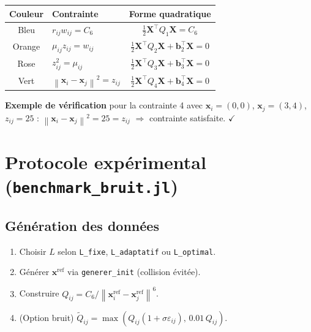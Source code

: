 \documentclass[12pt,a4paper]{article}
\newcommand{\norm}[1]{\left\|#1\right\|}
\begin{document}
\begin{center}
\small
\begin{tabular}{clc}
  \toprule
  \textbf{Couleur} & \textbf{Contrainte} & \textbf{Forme quadratique} \\
  \midrule
  \textcolor{contrainteBleu}{Bleu}   & $r_{ij}w_{ij}=C_6$        & $\frac{1}{2}\mathbf{X}^\top Q_1\mathbf{X}=C_6$ \\
  \textcolor{contrainteOrange}{Orange} & $\mu_{ij}z_{ij}=w_{ij}$   & $\frac{1}{2}\mathbf{X}^\top Q_2\mathbf{X}+\mathbf{b}_2^\top\mathbf{X}=0$ \\
  \textcolor{contrainteRose}{Rose}    & $z_{ij}^2=\mu_{ij}$       & $\frac{1}{2}\mathbf{X}^\top Q_3\mathbf{X}+\mathbf{b}_3^\top\mathbf{X}=0$ \\
  \textcolor{contrainteVert}{Vert}     & $\norm{\mathbf{x}_i-\mathbf{x}_j}^2=z_{ij}$ & $\frac{1}{2}\mathbf{X}^\top Q_4\mathbf{X}+\mathbf{b}_4^\top\mathbf{X}=0$ \\
  \bottomrule
\end{tabular}
\end{center}

\textbf{Exemple de vérification} pour la contrainte 4 avec
$\mathbf{x}_i=(0,0)$, $\mathbf{x}_j=(3,4)$, $z_{ij}=25$ :
$\norm{\mathbf{x}_i-\mathbf{x}_j}^2=25=z_{ij}$ $\Rightarrow$ contrainte satisfaite. $\checkmark$

\section{Protocole expérimental (\texttt{benchmark\_bruit.jl})}

\subsection{Génération des données}

\begin{enumerate}[leftmargin=2em]
  \item Choisir $L$ selon \texttt{L\_fixe}, \texttt{L\_adaptatif} ou \texttt{L\_optimal}.
  \item Générer $\mathbf{x}^{\mathrm{ref}}$ via \texttt{generer\_init} (collision évitée).
  \item Construire $Q_{ij} = C_6/\norm{\mathbf{x}^{\mathrm{ref}}_i-\mathbf{x}^{\mathrm{ref}}_j}^6$.
  \item (Option bruit) $\tilde{Q}_{ij} = \max(Q_{ij}(1+\sigma\varepsilon_{ij}),\,0.01\,Q_{ij})$.
\end{enumerate}
\end{document}
